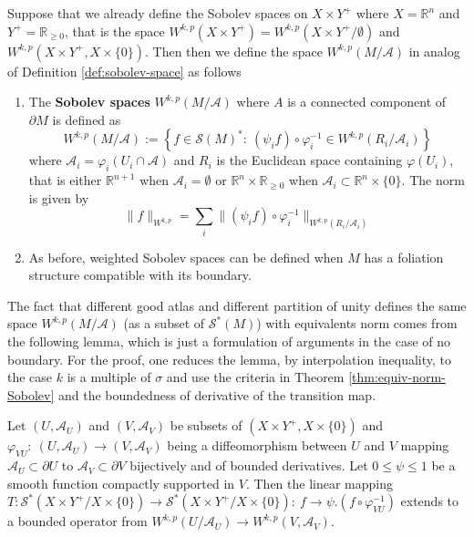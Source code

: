 Suppose that we already define the Sobolev spaces on \(X\times Y^+\) where
\(X = \mathbb{R}^n\) and \(Y^+ = \mathbb{R}_{\geq 0}\), that is the space \(W^{k,p}(X\times Y^+) = W^{k,p}(X\times Y^+/\emptyset)\) and \(W^{k,p}(X\times Y^+, X\times \{0\})\). Then then we define the space
\(W^{k,p}(M/ \mathcal{A})\) in analog of Definition \ref{def:sobolev-space} as follows

\begin{definition}
\label{def:sobolev-space-b}
\begin{enumerate}
\item The \textbf{Sobolev spaces} \(W^{k,p}(M/ \mathcal{A})\) where \(A\) is a connected
component of \(\partial M\) is defined as
\[
   W^{k,p}(M/ \mathcal{A}):=\left\{ f\in \mathcal{S}(M)^*:\ (\psi_i f)\circ
   \varphi_i^{-1}\in W^{k,p}(R_i/\mathcal{A}_i)\right\}
   \]
where \(\mathcal{A}_i = \varphi_i(U_i \cap \mathcal{A})\) and \(R_i\) is the
Euclidean space containing \(\varphi(U_i)\), that is either \(\mathbb{R}^{n+1}\) when \(\mathcal{A}_i=\emptyset\) or \(\mathbb{R}^{n}\times \mathbb{R}_{\geq 0}\) when \(\mathcal{A}_i\subset
   \mathbb{R}^n\times \{0\}\). The norm is given by
\[
    \|f\|_{W^{k,p}}= \sum_i \|(\psi_i f)\circ \varphi_i^{-1}\|_{W^{k,p}(R_i/\mathcal{A}_i)}
   \]
\item As before, weighted Sobolev spaces can be defined when \(M\) has a foliation
structure compatible with its boundary.
\end{enumerate}
\end{definition}

The fact that different good atlas and different partition of unity defines the same space
\(W^{k,p}(M/\mathcal{A})\) (as a subset of \(\mathcal{S}^*(M)\)) with equivalents norm
comes from the following lemma, which is just a formulation of arguments in the case of no
boundary. For the proof, one reduces the lemma, by interpolation
inequality, to the case \(k\) is a multiple of \(\sigma\) and use the criteria in
Theorem \ref{thm:equiv-norm-Sobolev} and the boundedness of derivative
of the transition map.

\begin{lemma}
\label{lem:equiv-norm-sobolev}
Let \((U,\mathcal{A}_U)\) and \((V,\mathcal{A}_V)\) be subsets of \((X\times Y^+,
X\times \{0\})\) and \(\varphi_{VU}:\ (U, \mathcal{A}_U) \longrightarrow (V, \mathcal{A}_V)\)
being a diffeomorphism between \(U\) and \(V\) mapping \(\mathcal{A}_U\subset \partial U\) to \(\mathcal{A}_V \subset \partial V\)
bijectively and of bounded derivatives. Let \(0\leq \psi \leq 1\) be a smooth function compactly supported in \(V\). Then the linear mapping \(T: \mathcal{S}^*(X\times Y^+/X\times \{0\}) \longrightarrow
\mathcal{S}^*(X\times Y^+/X\times\{0\}):\ f \longrightarrow \psi. (f\circ
\varphi^{-1}_{VU})\) extends to a bounded operator from \(W^{k,p}(U/\mathcal{A}_U)
\longrightarrow W^{k,p}(V, \mathcal{A}_V)\).
\end{lemma}

